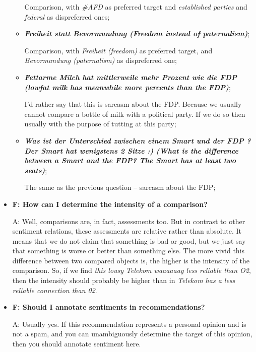 \documentclass[11pt,a4paper]{article}
\begin{document}
\begin{itemize}
\begin{itemize}
    Comparison, with \textit{\#AFD} as preferred target and
    \textit{established parties} and \textit{federal} as dispreferred ones;

  \item\textbf{\textit{Freiheit statt Bevormundung (Freedom instead of
      paternalism)}};

    Comparison, with \textit{Freiheit (freedom)} as preferred target, and
    \textit{Bevormundung (paternalism)} as dispreferred one;

  \item\textbf{\textit{Fettarme Milch hat mittlerweile mehr Prozent wie die
      FDP (lowfat milk has meanwhile more percents than the FDP)}};

    I'd rather say that this is sarcasm about the FDP.  Because we usually
    cannot compare a bottle of milk with a political party.  If we do so then
    usually with the purpose of tutting at this party;

  \item\textbf{\textit{Was ist der Unterschied zwischen einem Smart und der
      FDP ? Der Smart hat wenigstens 2 Sitze :) (What is the difference
      between a Smart and the FDP? The Smart has at least two seats)}};

    The same as the previous question -- sarcasm about the FDP;
  \end{itemize}

\item\textbf{F: How can I determine the intensity of a comparison?}

  A: Well, comparisons are, in fact, assessments too.  But in contrast to
  other sentiment relations, these assessments are relative rather than
  absolute.  It means that we do not claim that something is bad or good, but
  we just say that something is worse or better than something else.  The more
  vivid this difference between two compared objects is, the higher is the
  intensity of the comparison.  So, if we find \textit{this lousy Telekom
    waaaaaay less reliable than O2}, then the intensity should probably be
  higher than in \textit{Telekom has a less reliable connection than 02}.

\item\textbf{F: Should I annotate sentiments in recommendations?}

  A: Usually yes.  If this recommendation represents a personal opinion and is
  not a spam, and you can unambiguously determine the target of this opinion,
  then you should annotate sentiment here.


\end{itemize}
\end{document}

